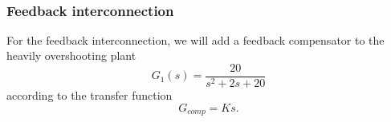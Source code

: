 \documentclass[11pt,a4paper, d]{scrartcl}
\begin{document}
    \begin{center}
    \end{center}
    { \hspace*{\fill} \\}
    
    \hypertarget{feedback-interconnection}{%
\subsubsection{Feedback
interconnection}\label{feedback-interconnection}}

For the feedback interconnection, we will add a feedback compensator to
the heavily overshooting plant \[G_1(s) = \frac{20}{s^2+2s+20}\]
according to the transfer function \[G_{comp} = K s.\]
\end{document}
